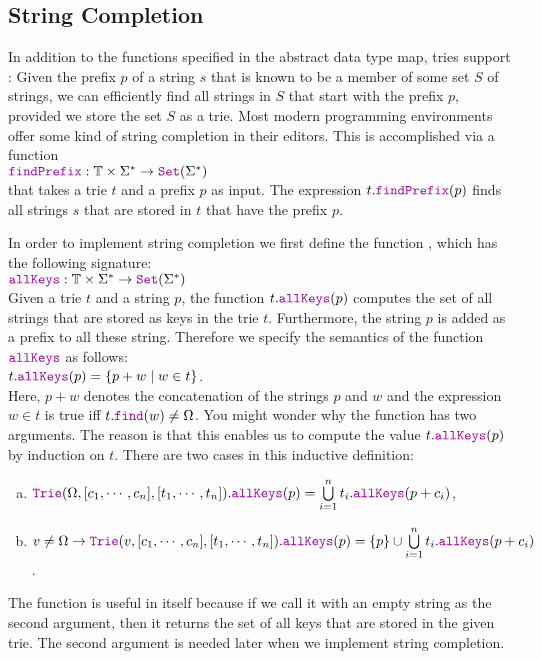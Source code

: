 \subsection{String Completion}
In addition to the functions specified in the abstract data type map, tries support
:  Given the prefix $p$ of a string $s$ that is known to be a
member of some set $S$ of strings, we can efficiently find all strings in $S$ that start with the prefix $p$, provided we
store the set $S$ as a trie.  Most modern programming environments offer some kind of string completion in
their editors.  This is accomplished via a function
\\[0.2cm]
\hspace*{1.3cm}
$\mytt{findPrefix}:\mathbb{T} \times \Sigma^* \rightarrow \mytt{Set}(\Sigma^*)$
\\[0.2cm]
that takes a trie $t$ and a prefix $p$ as input.  The expression $t.\mytt{findPrefix}(p)$ finds all
strings $s$ that are stored in $t$ that have the prefix $p$.

In order to implement string completion we first define the function , which
has the following signature:
\\[0.2cm]
\hspace*{1.3cm}
$\mytt{allKeys}: \mathbb{T} \times \Sigma^* \rightarrow \mytt{Set}(\Sigma^*)$
\\[0.2cm]
Given a trie $t$ and a string $p$, the function $t.\mytt{allKeys}(p)$ computes the set of all strings that
are stored as keys in the trie $t$.  Furthermore, the string $p$ is added as a prefix to all these string.
Therefore we specify the semantics of the function $\mytt{allKeys}$ as follows:
\\[0.2cm]
\hspace*{1.3cm}
$t.\mytt{allKeys}(p) = \{ p+w \mid w \in t \}$.
\\[0.2cm]
Here, $p+w$ denotes the concatenation of the strings $p$ and $w$ and the expression $w \in t$ is true iff
$t.\mytt{find}(w) \not= \Omega$.  You might wonder why the function  has two arguments.  The
reason is that this enables us to compute the value $t.\mytt{allKeys}(p)$ by induction on $t$.  There are two
cases in this inductive definition:  
\begin{enumerate}[(a)]
\item $\mytt{Trie}(\Omega, [c_1, \cdots, c_n], [t_1,\cdots,t_n]).\mytt{allKeys}(p) = 
       \bigcup\limits_{i=1}^n t_i.\mytt{allKeys}(p+c_i) 
      $,
\item $v \not= \Omega \rightarrow 
       \mytt{Trie}(v, [c_1, \cdots, c_n], [t_1,\cdots,t_n]).\mytt{allKeys}(p) = 
       \{p\} \cup \bigcup\limits_{i=1}^n t_i.\mytt{allKeys}(p+c_i) 
      $.
\end{enumerate}
The function  is useful in itself because if we call it with an empty string as the second
argument, then it returns the set of all keys that are stored in the given trie.  The second argument is needed
later when we implement string completion. 

